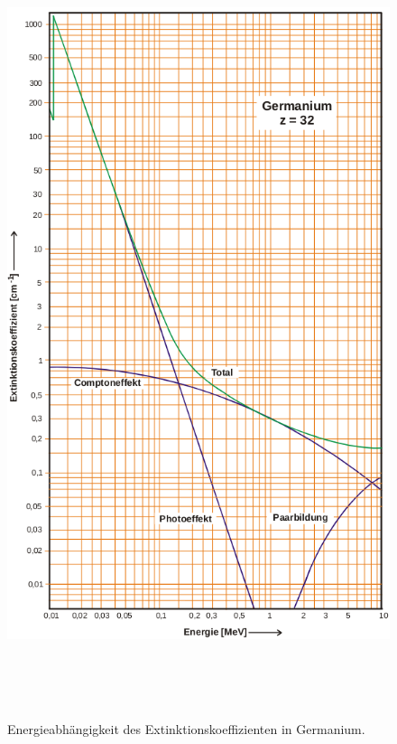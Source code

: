  \begin{figure}
   \centering
   \includegraphics[height=23cm]{content/Germanium.png}
   \caption{Energieabhängigkeit des Extinktionskoeffizienten in Germanium.\cite{V18}}
   \label{fig:Germanium}
 \end{figure}
